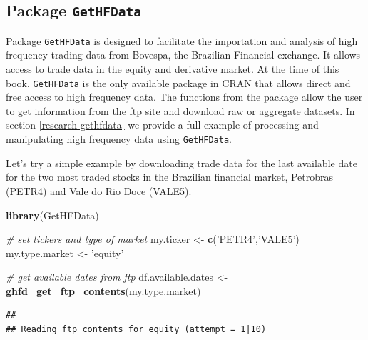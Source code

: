 \documentclass[11pt,]{book}
\newenvironment{Shaded}{\begin{snugshade}}{\end{snugshade}}
\newcommand{\KeywordTok}[1]{\textcolor[rgb]{0.27,0.27,0.27}{\textbf{#1}}}
\newcommand{\DataTypeTok}[1]{\textcolor[rgb]{0.27,0.27,0.27}{#1}}
\newcommand{\StringTok}[1]{\textcolor[rgb]{0.5,0.5,0.5}{#1}}
\newcommand{\CommentTok}[1]{\textcolor[rgb]{0.56,0.35,0.01}{\textit{#1}}}
\newcommand{\OperatorTok}[1]{\textcolor[rgb]{0.81,0.36,0.00}{\textbf{#1}}}
\newcommand{\NormalTok}[1]{#1}
\begin{document}
\subsection{\texorpdfstring{Package
\texttt{GetHFData}}{Package GetHFData}}\label{package-gethfdata}

Package \texttt{GetHFData} \citep{gethfdata} is designed to facilitate
the importation and analysis of high frequency trading data from
Bovespa, the Brazilian Financial exchange. It allows access to trade
data in the equity and derivative market. At the time of this book,
\texttt{GetHFData} is the only available package in CRAN that allows
direct and free access to high frequency data. The functions from the
package allow the user to get information from the ftp site and download
raw or aggregate datasets. In section \ref{research-gethfdata} we
provide a full example of processing and manipulating high frequency
data using \texttt{GetHFData}.

Let's try a simple example by downloading trade data for the last
available date for the two most traded stocks in the Brazilian financial
market, Petrobras (PETR4) and Vale do Rio Doce (VALE5).

\begin{Shaded}
\begin{Highlighting}[]
\KeywordTok{library}\NormalTok{(GetHFData)}

\CommentTok{# set tickers and type of market}
\NormalTok{my.ticker <-}\StringTok{ }\KeywordTok{c}\NormalTok{(}\StringTok{'PETR4'}\NormalTok{,}\StringTok{'VALE5'}\NormalTok{)}
\NormalTok{my.type.market <-}\StringTok{ 'equity'}

\CommentTok{# get available dates from ftp}
\NormalTok{df.available.dates <-}\StringTok{ }\KeywordTok{ghfd_get_ftp_contents}\NormalTok{(my.type.market)}
\end{Highlighting}
\end{Shaded}

\begin{verbatim}
## 
## Reading ftp contents for equity (attempt = 1|10)
\end{verbatim}

\begin{Shaded}
\end{Shaded}
\end{document}
